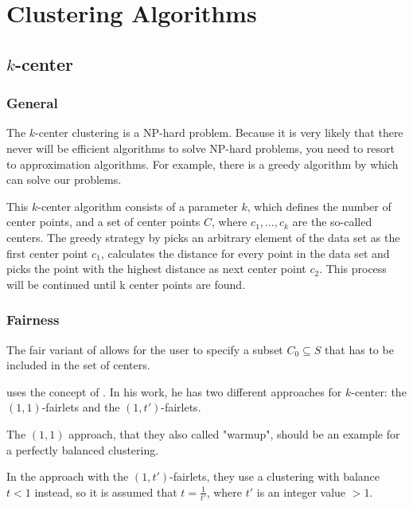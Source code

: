 \section{Clustering Algorithms}
\label{clustering-algorithms}


\subsection{$k$-center}
\label{k-center}

\subsubsection{General}
The $k$-center clustering is a NP-hard problem. Because it is very likely that there never will be efficient algorithms to solve NP-hard problems, you need to resort to approximation algorithms.
For example, there is a greedy algorithm by \textcite[]{Gonzalez1985ClusteringDistance} which can solve our problems.

This $k$-center algorithm consists of a parameter $k$, which defines the number of center points, and a set of center points $C$, where $c_{1},...,c_{k}$ are the so-called centers. \autocite[]{Kleindessner2019FairSummarization}
The greedy strategy by \textcite[]{Gonzalez1985ClusteringDistance} picks an arbitrary element of the data set as the first center point $c_{1}$, calculates the distance for every point in the data set and picks the point with the highest distance as next center point $c_{2}$. This process will be continued until k center points are found.

\subsubsection{Fairness}

The fair variant of \textcite[]{Kleindessner2019FairSummarization} allows for the user to specify a subset $C_{0} \subseteq S$ that has to be included in the set of centers.

\textcite[]{Chierichetti2018} uses the concept of . In his work, he has two different approaches for $k$-center: the $(1,1)$-fairlets and the $(1,t')$-fairlets.

The $(1,1)$ approach, that they also called "warmup", should be an example for a perfectly balanced clustering. \autocite[6]{Chierichetti2018}

In the approach with the $(1,t')$-fairlets, they use a clustering with balance $t < 1$ instead, so it is assumed that $t = \frac{1}{t'}$, where $t'$ is an integer value $> 1$. \autocite[6]{Chierichetti2018}


